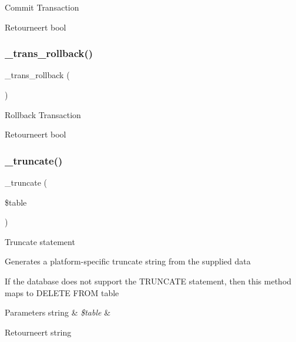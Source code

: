 Commit Transaction

\begin{DoxyReturn}{Retourneert}
bool 
\end{DoxyReturn}
\mbox{\label{class_c_i___d_b__sqlite3__driver_ad49a116b0776c26b53114c9093fd102a}} 
\subsubsection{\texorpdfstring{\_trans\_rollback()}{\_trans\_rollback()}}
{\footnotesize\ttfamily \+\_\+trans\+\_\+rollback (\begin{DoxyParamCaption}{ }\end{DoxyParamCaption})\hspace{0.3cm}{\ttfamily [protected]}}

Rollback Transaction

\begin{DoxyReturn}{Retourneert}
bool 
\end{DoxyReturn}
\mbox{\label{class_c_i___d_b__sqlite3__driver_aa029600528fc1ce660a23ff4b4667f95}} 
\subsubsection{\texorpdfstring{\_truncate()}{\_truncate()}}
{\footnotesize\ttfamily \+\_\+truncate (\begin{DoxyParamCaption}\item[{}]{\$table }\end{DoxyParamCaption})\hspace{0.3cm}{\ttfamily [protected]}}

Truncate statement

Generates a platform-\/specific truncate string from the supplied data

If the database does not support the T\+R\+U\+N\+C\+A\+TE statement, then this method maps to \textquotesingle{}D\+E\+L\+E\+TE F\+R\+OM table\textquotesingle{}


\begin{DoxyParams}[1]{Parameters}
string & {\em \$table} & \\
\hline
\end{DoxyParams}
\begin{DoxyReturn}{Retourneert}
string 
\end{DoxyReturn}
\mbox{\label{class_c_i___d_b__sqlite3__driver_a77248aaad33eb132c04cc4aa3f4bc8cb}} 
